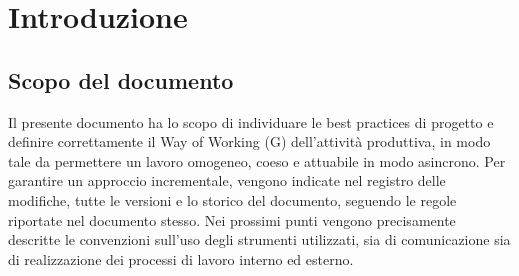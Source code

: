\documentclass{article}
\begin{document}
\pagebreak
\tableofcontents
\pagebreak

\section{Introduzione}

\subsection{Scopo del documento}
Il presente documento ha lo scopo di individuare le best practices di progetto e definire correttamente il Way of Working (G) dell'attività produttiva, in modo tale da permettere un lavoro omogeneo, coeso e attuabile in modo asincrono. Per garantire un approccio incrementale, vengono indicate nel registro delle modifiche, tutte le versioni e lo storico del documento, seguendo le regole riportate nel documento stesso. Nei prossimi punti vengono precisamente descritte le convenzioni sull'uso degli strumenti utilizzati, sia di comunicazione sia di realizzazione dei processi di lavoro interno ed esterno.
\end{document}
